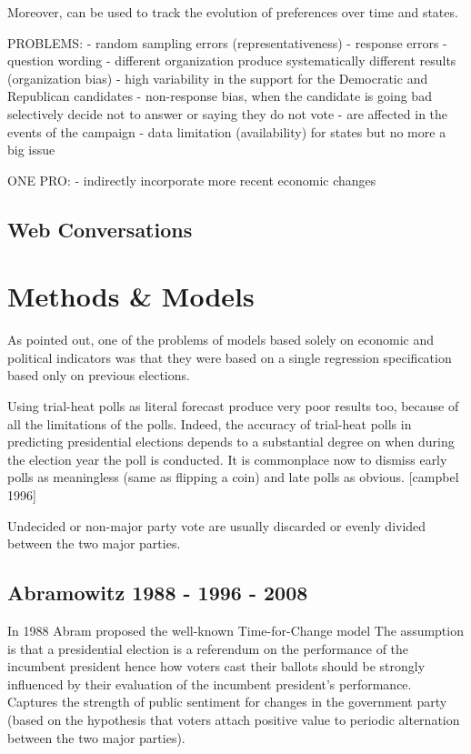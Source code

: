 \documentclass[
  12pt]{article}
\begin{document}
Moreover, can be used to track the evolution of preferences over time
and states.

PROBLEMS: - random sampling errors (representativeness) - response
errors - question wording - different organization produce
systematically different results (organization bias) - high variability
in the support for the Democratic and Republican candidates -
non-response bias, when the candidate is going bad selectively decide
not to answer or saying they do not vote - are affected in the events of
the campaign - data limitation (availability) for states but no more a
big issue

ONE PRO: - indirectly incorporate more recent economic changes

\hypertarget{web-conversations}{%
\subsection{Web Conversations}\label{web-conversations}}

\hypertarget{methods-models}{%
\section{Methods \& Models}\label{methods-models}}

As \citet{gel:kin:1993} pointed out, one of the problems of models based
solely on economic and political indicators was that they were based on
a single regression specification based only on previous elections.

Using trial-heat polls as literal forecast produce very poor results
too, because of all the limitations of the polls. Indeed, the accuracy
of trial-heat polls in predicting presidential elections depends to a
substantial degree on when during the election year the poll is
conducted. It is commonplace now to dismiss early polls as meaningless
(same as flipping a coin) and late polls as obvious. {[}campbel 1996{]}

Undecided or non-major party vote are usually discarded or evenly
divided between the two major parties.

\hypertarget{abramowitz-1988---1996---2008}{%
\subsection{Abramowitz 1988 - 1996 -
2008}\label{abramowitz-1988---1996---2008}}

In 1988 Abram proposed the well-known Time-for-Change model The
assumption is that a presidential election is a referendum on the
performance of the incumbent president hence how voters cast their
ballots should be strongly influenced by their evaluation of the
incumbent president's performance. Captures the strength of public
sentiment for changes in the government party (based on the hypothesis
that voters attach positive value to periodic alternation between the
two major parties).
\end{document}
